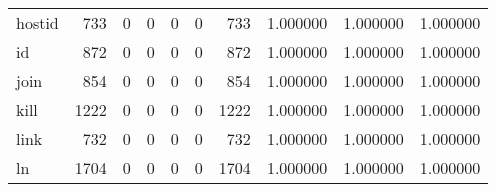 \begin{tabular}{lrrrrrrrrr}
hostid    &                                                733 &                                                  0 &                                                  0 &                                                  0 &                                                  0 &                                                733 &                                           1.000000 &                               1.000000 &                             1.000000 \\
id        &                                                872 &                                                  0 &                                                  0 &                                                  0 &                                                  0 &                                                872 &                                           1.000000 &                               1.000000 &                             1.000000 \\
join      &                                                854 &                                                  0 &                                                  0 &                                                  0 &                                                  0 &                                                854 &                                           1.000000 &                               1.000000 &                             1.000000 \\
kill      &                                               1222 &                                                  0 &                                                  0 &                                                  0 &                                                  0 &                                               1222 &                                           1.000000 &                               1.000000 &                             1.000000 \\
link      &                                                732 &                                                  0 &                                                  0 &                                                  0 &                                                  0 &                                                732 &                                           1.000000 &                               1.000000 &                             1.000000 \\
ln        &                                               1704 &                                                  0 &                                                  0 &                                                  0 &                                                  0 &                                               1704 &                                           1.000000 &                               1.000000 &                             1.000000 \\

\end{tabular}
